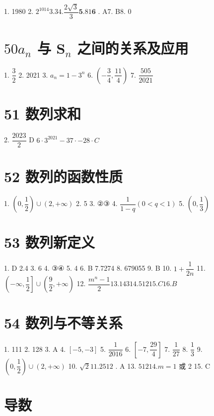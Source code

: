 \documentclass[10pt]{article}
\begin{document}
1. 1980 2. ${2}^{1014}{3.3}{4.}\dfrac{2\sqrt{3}}{3}\mathbf{5}{.81}\mathbf{6}$ . A7. B8. 0

\section*{${50}{a}_{n}$ 与 ${\mathbf{S}}_{n}$ 之间的关系及应用}

1. $\dfrac{3}{2}$ 2. 2021 3. ${a}_{n} = 1 - {3}^{n}$ 6. $\left( {-\dfrac{3}{4},\dfrac{11}{4}}\right)$ 7. $\dfrac{505}{2021}$

\section*{51 数列求和}

2. $\dfrac{2023}{2}$ D $6 \cdot  {3}^{2021} - 37 \cdot   - 28 \cdot  {C}$

\section*{52 数列的函数性质}

1. $\left( {0,\dfrac{1}{2}}\right)  \cup  \left( {2, + \infty }\right) $ 2. 5 3. ②③ 4. $\dfrac{1}{1 - q}\left( {0 < q < 1}\right) $ 5. $\left( {0,\dfrac{1}{3}}\right)$

\section*{53 数列新定义}

1. D 2.4 3. 6 4. ③④ 5. 4 6. B 7.7274 8. 679055 9. B 10. $1 + \dfrac{1}{2n}$ 11. $\left( {-\infty ,\dfrac{1}{2}}\right\rbrack   \cup  \left( {\dfrac{9}{2}, + \infty }\right) $ 12. $\dfrac{{m}^{n} - 1}{2}{13.143}{14.512}{15.}{C}{16.}{B}$

\section*{54 数列与不等关系}

1. 111 2. 128 3. A 4. $\left\lbrack  {-5, - 3}\right\rbrack$ 5. $\dfrac{1}{2016}$ 6. $\left\lbrack  {-7,\dfrac{29}{4}}\right\rbrack$ 7. $\dfrac{1}{27}$ 8. $\dfrac{1}{3}$ 9. $\left( {0,\dfrac{1}{2}}\right)  \cup  \left( {2, + \infty }\right) $ 10. $\sqrt{2}{11.25}{12}$ . A 13. ${512}{14}.m = 1$ 或 2 15. C

\section*{导数}
\end{document}
